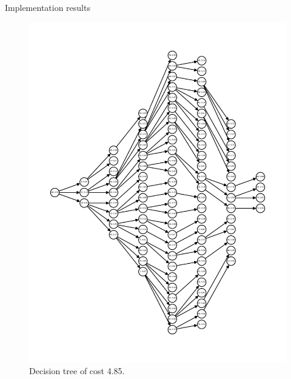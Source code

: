 \begin{frame}[allowframebreaks]{Implementation results}
\begin{figure}[htp]
{\begin{minipage}[t]{0.49\textwidth}
            \includegraphics[width=\textwidth]{figures/computed/dt_100.pdf}
            \caption{Decision tree of cost 4.85.}
        \end{minipage}
        }
    \end{figure}
    \begin{figure}[htp]
\end{figure}
\end{frame}

